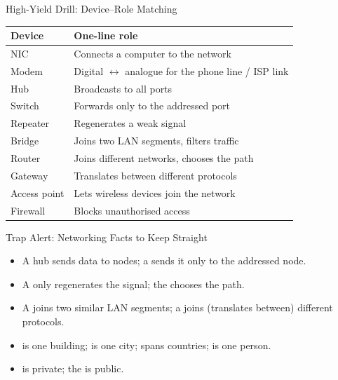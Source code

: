 \documentclass[aspectratio=169]{beamer}
\begin{document}
\begin{frame}{High-Yield Drill: Device--Role Matching}
  \begin{center}
    \begin{tabular}{p{}p{}}
      \toprule
      \textbf{Device} & \textbf{One-line role} \\
      \midrule
      NIC & Connects a computer to the network \\
      Modem & Digital $\leftrightarrow$ analogue for the phone line / ISP link \\
      Hub & Broadcasts to all ports \\
      Switch & Forwards only to the addressed port \\
      Repeater & Regenerates a weak signal \\
      Bridge & Joins two LAN segments, filters traffic \\
      Router & Joins different networks, chooses the path \\
      Gateway & Translates between different protocols \\
      Access point & Lets wireless devices join the network \\
      Firewall & Blocks unauthorised access \\
      \bottomrule
    \end{tabular}
  \end{center}
  \vspace{0.25cm}
\end{frame}

\begin{frame}{Trap Alert: Networking Facts to Keep Straight}
  \begin{itemize}
    \item A hub sends data to  nodes; a  sends it only
      to the addressed node.
    \item A  only regenerates the signal; the 
      chooses the path.
    \item A  joins two similar LAN segments; a 
      joins (translates between) different protocols.
    \item {} is one building;  is one city;  spans
      countries;  is one person.
    \item {} is private; the  is public.
  \end{itemize}
\end{frame}
\end{document}
